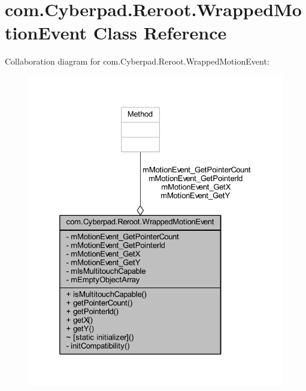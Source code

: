 \hypertarget{classcom_1_1_cyberpad_1_1_reroot_1_1_wrapped_motion_event}{
\section{com.\-Cyberpad.\-Reroot.\-Wrapped\-Motion\-Event \-Class \-Reference}
\label{classcom_1_1_cyberpad_1_1_reroot_1_1_wrapped_motion_event}
}


\-Collaboration diagram for com.\-Cyberpad.\-Reroot.\-Wrapped\-Motion\-Event\-:\nopagebreak
\begin{figure}[H]
\begin{center}
\leavevmode
\includegraphics[width=325pt]{classcom_1_1_cyberpad_1_1_reroot_1_1_wrapped_motion_event__coll__graph}
\end{center}
\end{figure}
